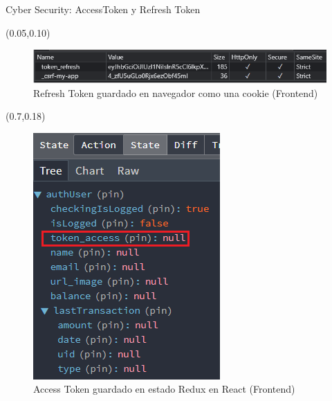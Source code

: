 \documentclass[xcolor=pdftex,dvipsnames,table]{beamer}
\begin{document}
\begin{frame}{Cyber Security: AccessToken y Refresh Token }
\footnotesize

    \begin{textblock*}{0.64\textwidth}(0.05\textwidth,0.10\textwidth)  
                    \begin{figure}
                        \centering
                        \includegraphics[width=1\linewidth]{cyber/3SEGURITY1.png}
                        \caption*{Refresh Token guardado en navegador como una cookie (Frontend)}
                        \label{fig:my_label}
                    \end{figure}
    \end{textblock*}
    

    \begin{textblock*}{0.3\textwidth}(0.7\textwidth,0.18\textwidth)  
                    \begin{figure}
                        \centering
                        \includegraphics[width=1\linewidth]{cyber/3SEGURITY2REDUX.png}
                        \caption*{Access Token guardado en estado Redux en React (Frontend)}
                        \label{fig:my_label}
                    \end{figure}
    \end{textblock*}


\end{frame}
\end{document}
